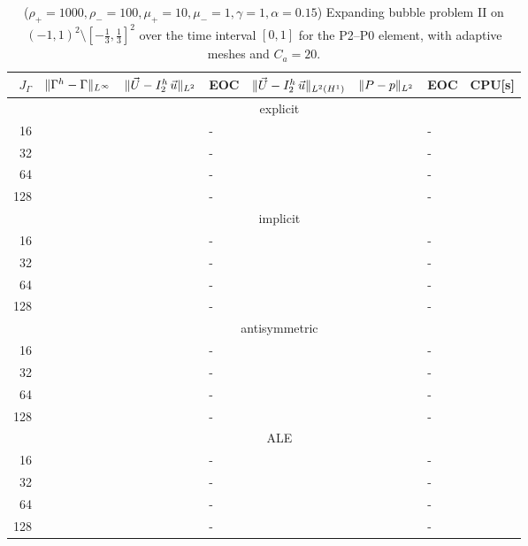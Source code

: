 \begin{table}
\center
\hspace*{-3.25cm}
\begin{tabular}{rllllllr}
\hline
$J_\Gamma$ & $\|\Gamma^h - \Gamma\|_{L^\infty}$ & $\|\vec U - I^h_{2}\,\vec u\|_{L^2}$ & EOC & $\|\vec U - I^h_{2}\,\vec u\|_{L^2(H^1)}$ & $\|P - p\|_{L^2}$ & EOC
& CPU[s] \\
\hline
& \multicolumn{7}{c}{explicit} \\
\hline
 16 & & & - & & & - & \\
 32 & & & - & & & - & \\
 64 & & & - & & & - & \\
128 & & & - & & & - & \\
\hline
& \multicolumn{7}{c}{implicit} \\
\hline
 16 & & & - & & & - & \\
 32 & & & - & & & - & \\
 64 & & & - & & & - & \\
128 & & & - & & & - & \\
\hline
& \multicolumn{7}{c}{antisymmetric} \\
\hline
 16 & & & - & & & - & \\
 32 & & & - & & & - & \\
 64 & & & - & & & - & \\
128 & & & - & & & - & \\
\hline
& \multicolumn{7}{c}{ALE} \\
\hline
 16 & & & - & & & - & \\
 32 & & & - & & & - & \\
 64 & & & - & & & - & \\
128 & & & - & & & - & \\
\hline
\end{tabular}
\hspace*{-3.25cm}
\caption[Navier--Stokes expanding bubble II errors P2--P0]
{($\rho_+ = 1000,\rho_- = 100,\mu_+ = 10,\mu_- =1,\gamma = 1,\alpha=0.15$)
Expanding bubble problem II on $(-1,1)^2\setminus[-\frac{1}{3},\frac{1}{3}]^2$
over the time interval $[0,1]$ for the P2--P0 element, with adaptive
meshes and $C_a=20$\textdegree.}
\label{tab:nsexpandingbubbleIIp2p0}
\end{table}

